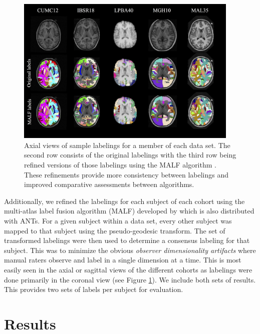 \documentclass{frontiersSCNS}
\begin{document}
\begin{figure}[htb]
  \centering
  \includegraphics[width=0.95\textwidth]{labels.jpg}
  \caption{Axial views of sample labelings for a member of each data set.  
  The second row consists of the original labelings with the third row being
  refined versions of those labelings using the MALF algorithm \cite{wang2012}.
  These refinements provide more consistency between labelings and improved
  comparative assessments between algorithms.
  }
  \label{fig:labels}
\end{figure}

Additionally, we refined the labelings for each subject of each cohort
using the multi-atlas label fusion algorithm (MALF) developed by \cite{wang2012}
which is also distributed with ANTs.
For a given subject within a data set, every other subject was mapped to 
that subject using the pseudo-geodesic transform.  The set of transformed labelings 
were then used to determine a consensus
labeling for that subject.
This was to minimize the obvious {\it observer dimensionality artifacts} where manual
raters observe and label in a single dimension at a time.  This
is most easily seen in the axial or sagittal views of the different cohorts 
as labelings were done primarily in the coronal view (see Figure \ref{fig:labels}).  
We include both sets of results.  This provides two sets of labels per subject
for evaluation.



\section{Results}
\end{document}
